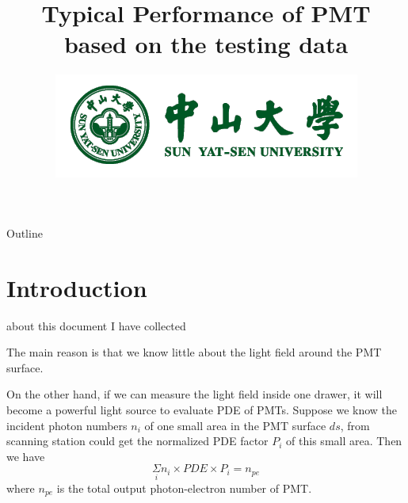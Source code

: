 \documentclass[11pt,compress,xcolor=x11names,UTF8]{beamer}
\title{ Typical Performance of PMT based on the testing data }
\author[Rong. Zhao]{Email：zhaor25@mail2.sysu.edu.cn \and  } %
\institute[SYSU]{School of Physics\and } %
\date[\today]{\includegraphics[width=.5\textwidth]{logo}}
\begin{document}
\maketitle

\begin{frame}{Outline}
\tableofcontents
\end{frame}

\section{Introduction}


\begin{frame}{about this document}
I have collected  

\vspace{.5cm}

\alert{The main reason is that we know little about the light field around the PMT surface.} 

\vspace{.5cm}

On the other hand, if we can measure the light field inside one drawer, it will become a powerful light source to evaluate PDE of PMTs. Suppose we know the incident photon numbers $n_i$ of one small area in the PMT surface $ds$, from scanning station could get the normalized PDE factor $P_i$ of this small area. Then we have   
\begin{equation}
\Sigma\limits_{i} n_i\times PDE\times P_i=n_{pe}
\label{eq:01}
\end{equation}
where $n_{pe}$ is the total output photon-electron number of PMT.
\end{frame}
\end{document}
